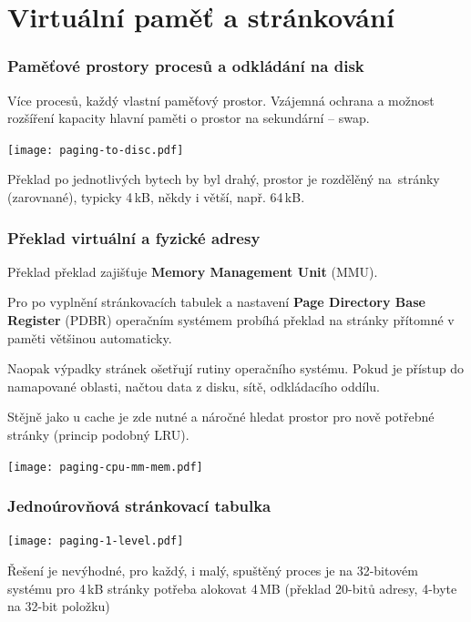 \documentclass{beamer}
\begin{document}
\section{Virtuální paměť a stránkování}

\begin{frame}
\frametitle{Paměťové prostory procesů a odkládání na disk}

Více procesů, každý vlastní paměťový prostor. Vzájemná ochrana
a možnost rozšíření kapacity hlavní paměti o prostor na sekundární -- swap.

{
\centering

\texttt{[image: paging-to-disc.pdf]}

}

Překlad po jednotlivých bytech by byl drahý, prostor je rozdělěný na~stránky
(zarovnané), typicky 4\,kB, někdy i větší, např. 64\,kB.

\end{frame}

\begin{frame}
\frametitle{Překlad virtuální a fyzické adresy}

Překlad překlad zajišťuje \textbf{Memory Management Unit} (MMU).

Pro po vyplnění stránkovacích tabulek a nastavení \textbf{Page Directory Base Register}
(PDBR) operačním systémem probíhá překlad na stránky přítomné v paměti většinou automaticky.

Naopak výpadky stránek ošetřují rutiny operačního systému. Pokud je přístup do namapované
oblasti, načtou data z disku, sítě, odkládacího oddílu.

Stějně jako u cache je zde nutné a náročné hledat prostor pro nově potřebné stránky (princip podobný LRU).

\vskip 2mm

{
\centering

\texttt{[image: paging-cpu-mm-mem.pdf]}

}
\end{frame}

\begin{frame}
\frametitle{Jednoúrovňová stránkovací tabulka}

{
\centering

\texttt{[image: paging-1-level.pdf]}

}

Řešení je nevýhodné, pro každý, i malý, spuštěný proces je na 32-bitovém
systému pro 4\,kB stránky potřeba alokovat 4\,MB (překlad 20-bitů adresy,
4-byte na 32-bit položku) 

\end{frame}
\end{document}
